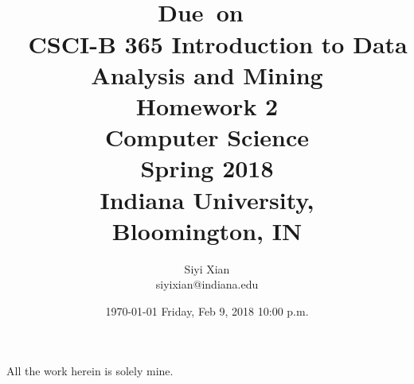 \documentclass{article}
\title{
\vspace{2in}
\textmd{\textbf{\hmwkClass\ \hmwkTitle}}\\
\normalsize\vspace{0.1in}\small{Due\ on\ \hmwkDueDate}\\
\vspace{0.1in}\large{\textit{\hmwkClassInstructor\ }}
\vspace{3in}
}
\author{\textbf{\hmwkAuthorName}}
\date{\today} %
\begin{document}
\title{ CSCI-B 365 Introduction to Data Analysis and Mining\\
Homework 2 \\
Computer Science \\
Spring 2018 \\Indiana University,\\ Bloomington, IN}
\author{ Siyi Xian \\ siyixian@indiana.edu}
\date{ Friday, Feb 9,  2018 10:00 p.m. }
\maketitle
All the work herein is solely mine.

\maketitle



\newpage
\tableofcontents
\newpage

\end{document}
